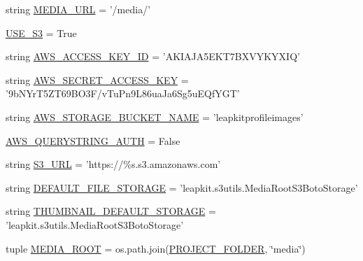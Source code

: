 \begin{DoxyCompactItemize}
\item 
string \hyperlink{namespaceleapkit_1_1settings_1_1base__settings__local_a34edd3ef114b9d63ec0cb750410af5d8}{M\-E\-D\-I\-A\-\_\-\-U\-R\-L} = '/media/'
\item 
\hyperlink{namespaceleapkit_1_1settings_1_1base__settings__local_aef0acf03e8742af572723802d342a274}{U\-S\-E\-\_\-\-S3} = True
\item 
string \hyperlink{namespaceleapkit_1_1settings_1_1base__settings__local_a80873301ac8c857981e50cb1e6186876}{A\-W\-S\-\_\-\-A\-C\-C\-E\-S\-S\-\_\-\-K\-E\-Y\-\_\-\-I\-D} = 'A\-K\-I\-A\-J\-A5\-E\-K\-T7\-B\-X\-V\-Y\-K\-Y\-X\-I\-Q'
\item 
string \hyperlink{namespaceleapkit_1_1settings_1_1base__settings__local_ac5ca0a4b3c1180803c46ce9b1ba591a3}{A\-W\-S\-\_\-\-S\-E\-C\-R\-E\-T\-\_\-\-A\-C\-C\-E\-S\-S\-\_\-\-K\-E\-Y} = '9b\-N\-Yr\-T5\-Z\-T69\-B\-O3\-F/v\-Tu\-Pn9\-L86ua\-Ja6\-Sg5u\-E\-Qf\-Y\-G\-T'
\item 
string \hyperlink{namespaceleapkit_1_1settings_1_1base__settings__local_af242cc4fd7de918c025f09a893ee4efc}{A\-W\-S\-\_\-\-S\-T\-O\-R\-A\-G\-E\-\_\-\-B\-U\-C\-K\-E\-T\-\_\-\-N\-A\-M\-E} = 'leapkitprofileimages'
\item 
\hyperlink{namespaceleapkit_1_1settings_1_1base__settings__local_a1a32fa8ed420d57a810930b182264838}{A\-W\-S\-\_\-\-Q\-U\-E\-R\-Y\-S\-T\-R\-I\-N\-G\-\_\-\-A\-U\-T\-H} = False
\item 
string \hyperlink{namespaceleapkit_1_1settings_1_1base__settings__local_a20887bed2c5d3feea5efc361fb131771}{S3\-\_\-\-U\-R\-L} = 'https\-://\%s.\-s3.\-amazonaws.\-com'
\item 
string \hyperlink{namespaceleapkit_1_1settings_1_1base__settings__local_aae7d1e53dcc45e708f12cba04046e0a6}{D\-E\-F\-A\-U\-L\-T\-\_\-\-F\-I\-L\-E\-\_\-\-S\-T\-O\-R\-A\-G\-E} = 'leapkit.\-s3utils.\-Media\-Root\-S3\-Boto\-Storage'
\item 
string \hyperlink{namespaceleapkit_1_1settings_1_1base__settings__local_aba0bef6113f81b14dcf60a3aa9d68126}{T\-H\-U\-M\-B\-N\-A\-I\-L\-\_\-\-D\-E\-F\-A\-U\-L\-T\-\_\-\-S\-T\-O\-R\-A\-G\-E} = 'leapkit.\-s3utils.\-Media\-Root\-S3\-Boto\-Storage'
\item 
tuple \hyperlink{namespaceleapkit_1_1settings_1_1base__settings__local_aa1a9481b25a16ffebed277e259ae7f2a}{M\-E\-D\-I\-A\-\_\-\-R\-O\-O\-T} = os.\-path.\-join(\hyperlink{namespaceleapkit_1_1settings_1_1base__settings__local_a7683d01d853ba8d1db18d71d0ef9760f}{P\-R\-O\-J\-E\-C\-T\-\_\-\-F\-O\-L\-D\-E\-R}, \char`\"{}media\char`\"{})
\item 

\end{DoxyCompactItemize}
